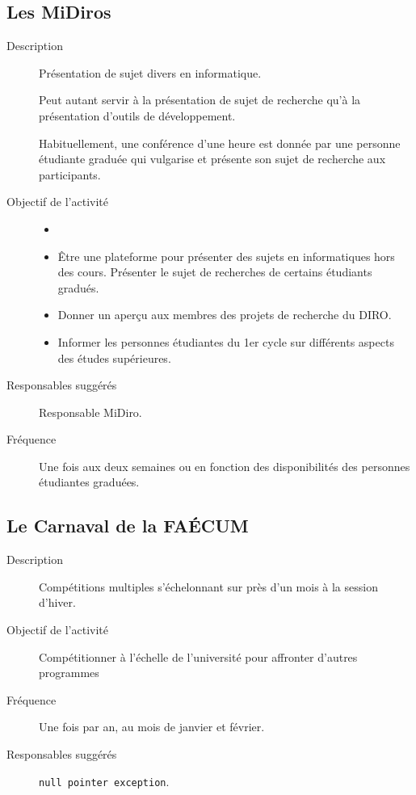 \documentclass{aediroum}
\begin{document}
\subsection{Les MiDiros}
\begin{description}
	\item[Description] Présentation de sujet divers en informatique.

	Peut autant servir à la présentation de sujet de recherche qu'à la présentation d'outils de développement.

	Habituellement, une conférence d'une heure est donnée par une personne étudiante graduée qui vulgarise et présente son sujet de recherche aux participants.
	\item[Objectif de l'activité]
	\begin{itemize}
		\item[]
		\item Être une plateforme pour présenter des sujets en informatiques hors des cours. Présenter le sujet de recherches de certains étudiants gradués.
		\item Donner un aperçu aux membres des projets de recherche du DIRO.
		\item Informer les personnes étudiantes du 1er cycle sur différents aspects des études supérieures.
	\end{itemize}
	\item[Responsables suggérés] Responsable MiDiro.
 	\item[Fréquence] Une fois aux deux semaines ou en fonction des disponibilités des personnes étudiantes graduées.
\end{description}

\subsection{Le Carnaval de la FAÉCUM}
\begin{description}
	\item[Description] Compétitions multiples s'échelonnant sur près d'un mois à la session d'hiver.
	\item[Objectif de l'activité] Compétitionner à l'échelle de l'université pour affronter d'autres programmes
	\item[Fréquence] Une fois par an, au mois de janvier et février.
	\item[Responsables suggérés] \texttt{null pointer exception}.
\end{description}
\end{document}
